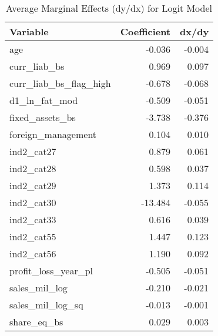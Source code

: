 \begin{table}

\caption{Average Marginal Effects (dy/dx) for Logit Model}
\centering
\begin{tabular}[t]{l|r|r}
\hline
Variable & Coefficient & dx/dy\\
\hline
age & -0.036 & -0.004\\
\hline
curr\_liab\_bs & 0.969 & 0.097\\
\hline
curr\_liab\_bs\_flag\_high & -0.678 & -0.068\\
\hline
d1\_ln\_fat\_mod & -0.509 & -0.051\\
\hline
fixed\_assets\_bs & -3.738 & -0.376\\
\hline
foreign\_management & 0.104 & 0.010\\
\hline
ind2\_cat27 & 0.879 & 0.061\\
\hline
ind2\_cat28 & 0.598 & 0.037\\
\hline
ind2\_cat29 & 1.373 & 0.114\\
\hline
ind2\_cat30 & -13.484 & -0.055\\
\hline
ind2\_cat33 & 0.616 & 0.039\\
\hline
ind2\_cat55 & 1.447 & 0.123\\
\hline
ind2\_cat56 & 1.190 & 0.092\\
\hline
profit\_loss\_year\_pl & -0.505 & -0.051\\
\hline
sales\_mil\_log & -0.210 & -0.021\\
\hline
sales\_mil\_log\_sq & -0.013 & -0.001\\
\hline
share\_eq\_bs & 0.029 & 0.003\\
\hline
\end{tabular}
\end{table}